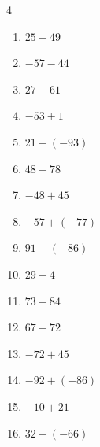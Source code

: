 \begin{multicols}{4}
\begin{enumerate}
        \phantom{$=24$}

  \item $25-49$

        \phantom{$=-24$}

  \item $-57-44$

        \phantom{$=-101$}

  \item $27+61$

        \phantom{$=88$}

  \item $-53+1$

        \phantom{$=-52$}

  \item $21+(-93)$

        \phantom{$=-72$}

  \item $48+78$

        \phantom{$=126$}

  \item $-48+45$

        \phantom{$=-3$}

  \item $-57+(-77)$

        \phantom{$=-134$}

  \item $91-(-86)$

        \phantom{$=177$}

  \item $29-4$

        \phantom{$=25$}

  \item $73-84$

        \phantom{$=-11$}

\columnbreak %

  \item $67-72$

        \phantom{$=-5$}

  \item $-72+45$

        \phantom{$=-27$}

  \item $-92+(-86)$

        \phantom{$=-178$}

  \item $-10+21$

        \phantom{$=11$}

  \item $32+(-66)$


\end{enumerate}
\end{multicols}
